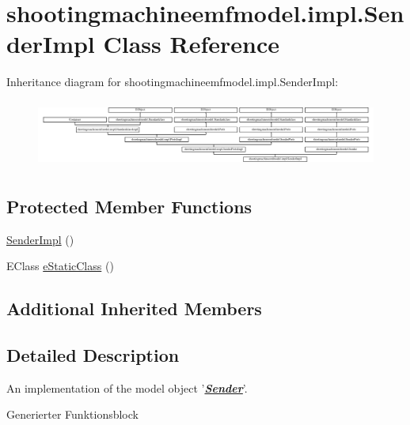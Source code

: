 \hypertarget{classshootingmachineemfmodel_1_1impl_1_1_sender_impl}{\section{shootingmachineemfmodel.\-impl.\-Sender\-Impl Class Reference}
\label{classshootingmachineemfmodel_1_1impl_1_1_sender_impl}
}
Inheritance diagram for shootingmachineemfmodel.\-impl.\-Sender\-Impl\-:\begin{figure}[H]
\begin{center}
\leavevmode
\includegraphics[height=2.247492cm]{classshootingmachineemfmodel_1_1impl_1_1_sender_impl}
\end{center}
\end{figure}
\subsection*{Protected Member Functions}
\begin{DoxyCompactItemize}
\item 
\hyperlink{classshootingmachineemfmodel_1_1impl_1_1_sender_impl_a77c5303886346dcbda81fe96547ff8a5}{Sender\-Impl} ()
\item 
E\-Class \hyperlink{classshootingmachineemfmodel_1_1impl_1_1_sender_impl_a6a46da8cfc6e4fcb81dbfdff01171dac}{e\-Static\-Class} ()
\end{DoxyCompactItemize}
\subsection*{Additional Inherited Members}


\subsection{Detailed Description}
An implementation of the model object '{\itshape {\bfseries \hyperlink{interfaceshootingmachineemfmodel_1_1_sender}{Sender}}}'.

Generierter Funktionsblock 

